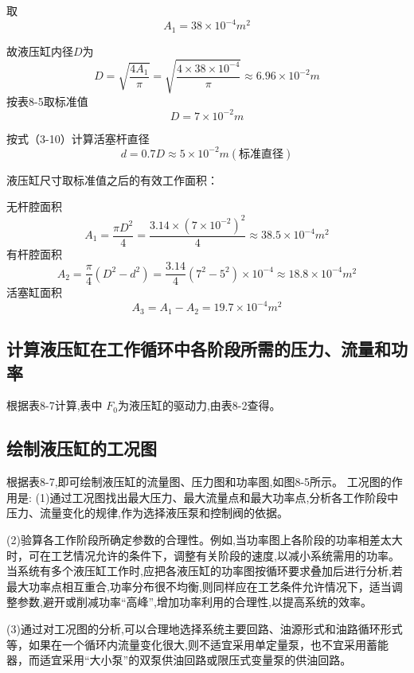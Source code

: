 取$$A_1=38\times 10^{-4}m^2$$

故液压缸内径$D$为
\begin{equation*}
D=\sqrt {\frac{4A_1}{\pi}}=\sqrt{\frac{4\times 38\times 10^{-4}}{\pi}}\approx 6.96\times 10^{-2}m
\end{equation*}
按表8-5取标准值 $$D=7\times 10^{-2}m$$

按式（3-10）计算活塞杆直径
\begin{equation*}
d=0.7D\approx 5\times 10^{-2}m(\text{标准直径})
\end{equation*}

液压缸尺寸取标准值之后的有效工作面积：

无杆腔面积 
\begin{equation*}
A_1=\frac{\pi D^2}{4}=\frac{3.14\times (7\times 10^{-2})^2}{4}\approx 38.5\times 10^{-4}m^2
\end{equation*}
有杆腔面积
\begin{equation*}
A_2=\frac {\pi}{4}(D^2-d^2)=\frac{3.14}{4}(7^2-5^2)\times 10^{-4}\approx 18.8\times 10^{-4}m^2
\end{equation*}
活塞缸面积 
\begin{equation*}
A_3=A_1-A_2=19.7\times 10^{-4}m^2
\end{equation*}
\subsection{计算液压缸在工作循环中各阶段所需的压力、流量和功率}
根据表8-7计算,表中 $F_0$为液压缸的驱动力,由表8-2查得。
\subsection{绘制液压缸的工况图}
根据表8-7,即可绘制液压缸的流量图、压力图和功率图,如图8-5所示。
工况图的作用是:
(1)通过工况图找出最大压力、最大流量点和最大功率点,分析各工作阶段中压力、流量变化的规律,作为选择液压泵和控制阀的依据。

(2)验算各工作阶段所确定参数的合理性。例如,当功率图上各阶段的功率相差太大时，可在工艺情况允许的条件下，调整有关阶段的速度,以减小系统需用的功率。当系统有多个液压缸工作时,应把各液压缸的功率图按循环要求叠加后进行分析,若最大功率点相互重合,功率分布很不均衡,则同样应在工艺条件允许情况下，适当调整参数,避开或削减功率“高峰”,增加功率利用的合理性,以提高系统的效率。

(3)通过对工况图的分析,可以合理地选择系统主要回路、油源形式和油路循环形式等，如果在一个循环内流量变化很大,则不适宜采用单定量泵，也不宜采用蓄能器，而适宜采用“大小泵”的双泵供油回路或限压式变量泵的供油回路。

